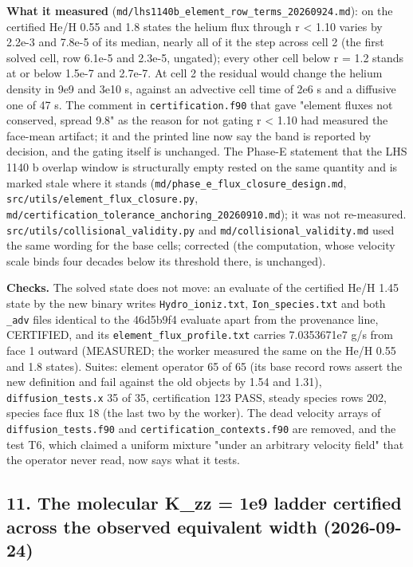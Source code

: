 \documentclass[english,a4paper]{my_memo}
\begin{document}
\textbf{What it measured} (\texttt{md/lhs1140b\_element\_row\_terms\_20260924.md}): on the
certified He/H 0.55 and 1.8 states the helium flux through r \textless{} 1.10 varies by
2.2e-3 and 7.8e-5 of its median, nearly all of it the step across cell 2 (the
first solved cell, row 6.1e-5 and 2.3e-5, ungated); every other cell below
r = 1.2 stands at or below 1.5e-7 and 2.7e-7. At cell 2 the residual would change
the helium density in 9e9 and 3e10 s, against an advective cell time of 2e6 s
and a diffusive one of 47 s. The comment in \texttt{certification.f90} that gave
"element fluxes not conserved, spread 9.8" as the reason for not gating
r \textless{} 1.10 had measured the face-mean artifact; it and the printed line now say
the band is reported by decision, and the gating itself is unchanged. The
Phase-E statement that the LHS 1140 b overlap window is structurally empty
rested on the same quantity and is marked stale where it stands
(\texttt{md/phase\_e\_flux\_closure\_design.md}, \texttt{src/utils/element\_flux\_closure.py},
\texttt{md/certification\_tolerance\_anchoring\_20260910.md}); it was not re-measured.
\texttt{src/utils/collisional\_validity.py} and \texttt{md/collisional\_validity.md} used
the same wording for the base cells; corrected (the computation, whose
velocity scale binds four decades below its threshold there, is unchanged).

\textbf{Checks.} The solved state does not move: an evaluate of the certified He/H
1.45 state by the new binary writes \texttt{Hydro\_ioniz.txt}, \texttt{Ion\_species.txt} and
both \texttt{\_adv} files identical to the 46d5b9f4 evaluate apart from the
provenance line, CERTIFIED, and its \texttt{element\_flux\_profile.txt} carries
7.0353671e7 g/s from face 1 outward (MEASURED; the worker measured the same on
the He/H 0.55 and 1.8 states). Suites: element operator 65 of 65 (its base
record rows assert the new definition and fail against the old objects by
1.54 and 1.31), \texttt{diffusion\_tests.x} 35 of 35, certification 123 PASS,
steady species rows 202, species face flux 18 (the last two by the worker).
The dead velocity arrays of \texttt{diffusion\_tests.f90} and
\texttt{certification\_contexts.f90} are removed, and the test T6, which claimed a
uniform mixture "under an arbitrary velocity field" that the operator never
read, now says what it tests.

\subsection{11. The molecular K\_zz = 1e9 ladder certified across the observed equivalent width (2026-09-24)}\label{11-the-molecular-k_zz--1e9-ladder-certified-across-the-observed-equivalent-width-2026-09-24}
\end{document}
